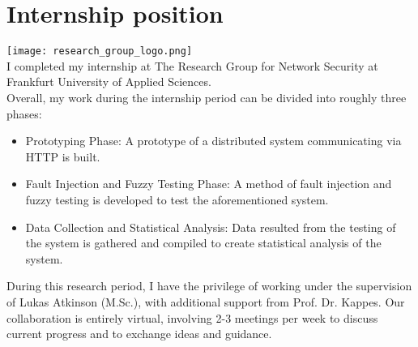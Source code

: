 \chapter{\centering Internship position}

\texttt{[image: research\_group\_logo.png]} \\

I completed my internship at The Research Group for Network Security at\\
Frankfurt University of Applied Sciences.\\ 

Overall, my work during the internship period can be divided into roughly three phases:
\begin{itemize}
  \item Prototyping Phase: A prototype of a distributed system communicating via HTTP 
    is built.
  \item Fault Injection and Fuzzy Testing Phase: A method of fault injection and fuzzy testing is developed
    to test the aforementioned system.
  \item Data Collection and Statistical Analysis: Data resulted from the testing of the system is gathered
    and compiled to create statistical analysis of the system.
\end{itemize}


During this research period, I have the privilege of working under the supervision 
of Lukas Atkinson (M.Sc.), with additional support from Prof. Dr. Kappes. Our 
collaboration is entirely virtual, involving 2-3 meetings per week to discuss 
current progress and to exchange ideas and guidance.




